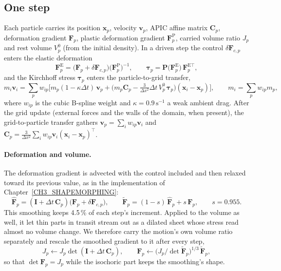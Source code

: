\subsection{One step}
Each particle carries its position $\mathbf{x}_p$, velocity $\mathbf{v}_p$, APIC affine matrix $\mathbf{C}_p$,
deformation gradient $\mathbf{F}_p$, plastic deformation gradient $\mathbf{F}^{\mathrm{P}}_p$, carried volume ratio
$J_p$ and rest volume $V^0_p$ (from the initial density). In a driven step the control $\delta\mathbf{F}_{c,p}$
enters the elastic deformation
\begin{equation}
\label{eq:control_F}
\mathbf{F}^{\mathrm{E}}_p=\big(\mathbf{F}_p+\delta\mathbf{F}_{c,p}\big)\big(\mathbf{F}^{\mathrm{P}}_p\big)^{-1},
\qquad
\boldsymbol{\tau}_p=\mathbf{P}\big(\mathbf{F}^{\mathrm{E}}_p\big)\,\mathbf{F}^{\mathrm{E}\top}_p ,
\end{equation}
and the Kirchhoff stress $\boldsymbol{\tau}_p$ enters the particle-to-grid transfer,
\begin{equation}
\label{ch4:eq_p2g}
m_i\mathbf{v}_i=\sum_p w_{ip}\Big[m_p(1-\kappa\Delta t)\,\mathbf{v}_p
  +\Big(m_p\mathbf{C}_p-\tfrac{3}{\Delta x^{2}}\Delta t\,V^0_p\,\boldsymbol{\tau}_p\Big)(\mathbf{x}_i-\mathbf{x}_p)\Big],
\qquad m_i=\sum_p w_{ip}m_p ,
\end{equation}
where $w_{ip}$ is the cubic B-spline weight and $\kappa=0.9\,\mathrm{s}^{-1}$ a weak ambient drag. After the grid
update (external forces and the walls of the domain, when present), the grid-to-particle transfer gathers
$\mathbf{v}_p=\sum_i w_{ip}\mathbf{v}_i$ and
$\mathbf{C}_p=\tfrac{3}{\Delta x^2}\sum_i w_{ip}\mathbf{v}_i(\mathbf{x}_i-\mathbf{x}_p)^{\top}$.

\paragraph{Deformation and volume.} The deformation gradient is advected with the control included and then
relaxed toward its previous value, as in the implementation of Chapter~\ref{CH3_SHAPEMORPHING}:
\begin{equation}
\hat{\mathbf{F}}_p=(\mathbf{I}+\Delta t\,\mathbf{C}_p)\big(\mathbf{F}_p+\delta\mathbf{F}_{c,p}\big),\qquad
\tilde{\mathbf{F}}_p=(1-s)\,\hat{\mathbf{F}}_p+s\,\mathbf{F}_p ,\qquad s=0.955 .
\end{equation}
This smoothing keeps 4.5\,\% of each step's increment. Applied to the volume as well, it let thin parts in transit
stream out as a dilated sheet whose stress read almost no volume change. We therefore carry the motion's own volume
ratio separately and rescale the smoothed gradient to it after every step,
\begin{equation}
\label{ch4:eq_volume}
J_p\leftarrow J_p\det(\mathbf{I}+\Delta t\,\mathbf{C}_p),\qquad
\mathbf{F}_p\leftarrow\big(J_p/\det\tilde{\mathbf{F}}_p\big)^{1/3}\,\tilde{\mathbf{F}}_p ,
\end{equation}
so that $\det\mathbf{F}_p=J_p$ while the isochoric part keeps the smoothing's shape.

